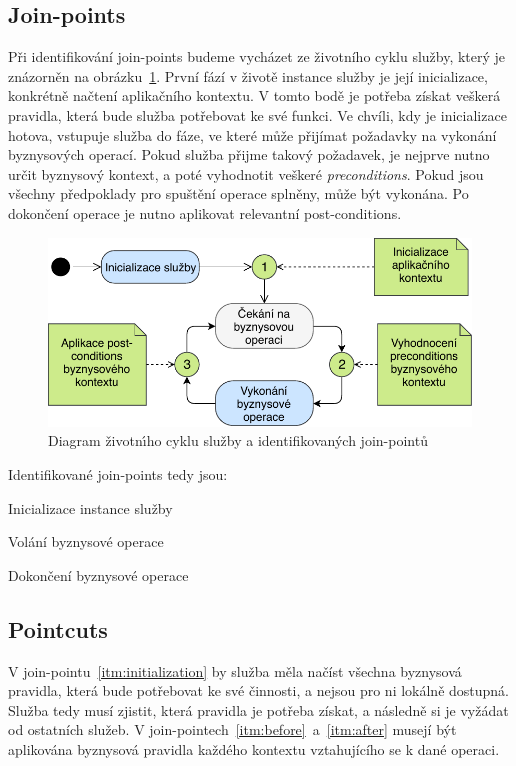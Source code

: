 \subsection{Join-points}

Při identifikování join-points budeme vycházet ze životního cyklu služby, který je znázorněn
na obrázku~\ref{fig:join-points}. První fází v životě instance služby je její inicializace,
konkrétně načtení aplikačního kontextu. V tomto bodě je potřeba získat veškerá pravidla, která
bude služba potřebovat ke své funkci.
Ve chvíli, kdy je inicializace hotova, vstupuje služba do fáze, ve které může přijímat požadavky
na vykonání byznysových operací. Pokud služba přijme takový požadavek, je nejprve nutno určit
byznysový kontext, a poté vyhodnotit veškeré \textit{preconditions}. Pokud jsou všechny předpoklady
pro spuštění operace splněny, může být vykonána. Po dokončení operace je nutno aplikovat relevantní
post-conditions.

\begin{figure}
    \centering
    \includegraphics[keepaspectratio=true, width=0.8\linewidth]{figures/join-points.pdf}
    \caption{Diagram životn\'{\i}ho cyklu služby a identifikovan\'ych join-pointů}
    \label{fig:join-points}
\end{figure}

Identifikované join-points tedy jsou:

\benum[label=\circledarabic]
\item\label{itm:initialization} Inicializace instance služby
\item\label{itm:before} Volání byznysové operace
\item\label{itm:after} Dokončení byznysové operace
\eenum

\subsection{Pointcuts}

V join-pointu~\ref{itm:initialization} by služba měla načíst všechna byznysová pravidla, která
bude potřebovat ke své činnosti, a nejsou pro ni lokálně dostupná. Služba tedy musí zjistit,
která pravidla je potřeba získat, a následně si je vyžádat od ostatních služeb.
V join-pointech~\ref{itm:before}~a~\ref{itm:after} musejí být aplikována byznysová pravidla každého
kontextu vztahujícího se k dané operaci.

